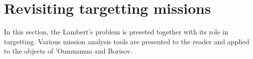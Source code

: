 \chapter{Revisiting targetting missions}

In this section, the Lambert's problem is preseted together with its role in
targetting. Various mission analysis tools are presented to the reader and
applied to the objects of 'Oumuamua and Borisov.






